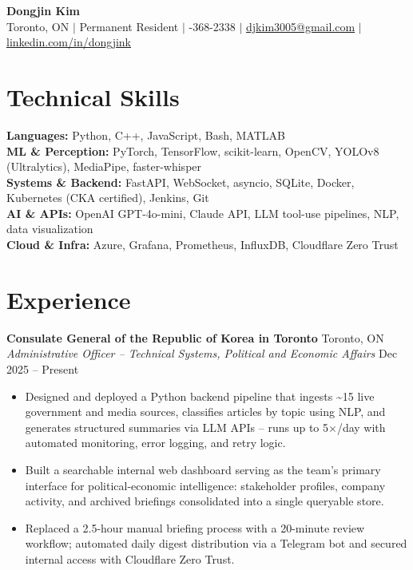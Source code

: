 \documentclass[10pt,a4paper]{article}
\begin{document}
\begin{center}
    {\Large \textbf{Dongjin Kim}} \\[3pt]
    Toronto, ON \enspace $|$ \enspace Permanent Resident \enspace $|$ -368-2338 \enspace $|$ \enspace \href{mailto:djkim3005@gmail.com}{djkim3005@gmail.com} \enspace $|$ \enspace \href{https://www.linkedin.com/in/dongjink}{linkedin.com/in/dongjink}
\end{center}

\section*{Technical Skills}
\textbf{Languages:} Python, C++, JavaScript, Bash, MATLAB \\
\textbf{ML \& Perception:} PyTorch, TensorFlow, scikit-learn, OpenCV, YOLOv8 (Ultralytics), MediaPipe, faster-whisper \\
\textbf{Systems \& Backend:} FastAPI, WebSocket, asyncio, SQLite, Docker, Kubernetes (CKA certified), Jenkins, Git \\
\textbf{AI \& APIs:} OpenAI GPT-4o-mini, Claude API, LLM tool-use pipelines, NLP, data visualization \\
\textbf{Cloud \& Infra:} Azure, Grafana, Prometheus, InfluxDB, Cloudflare Zero Trust

\section*{Experience}

\textbf{Consulate General of the Republic of Korea in Toronto} \hfill Toronto, ON \\
\textit{Administrative Officer -- Technical Systems, Political and Economic Affairs} \hfill Dec 2025 -- Present
\begin{itemize}
    \item Designed and deployed a Python backend pipeline that ingests \textasciitilde15 live government and media sources, classifies articles by topic using NLP, and generates structured summaries via LLM APIs -- runs up to 5$\times$/day with automated monitoring, error logging, and retry logic.
    \item Built a searchable internal web dashboard serving as the team's primary interface for political-economic intelligence: stakeholder profiles, company activity, and archived briefings consolidated into a single queryable store.
    \item Replaced a 2.5-hour manual briefing process with a 20-minute review workflow; automated daily digest distribution via a Telegram bot and secured internal access with Cloudflare Zero Trust.
\end{itemize}
\end{document}
